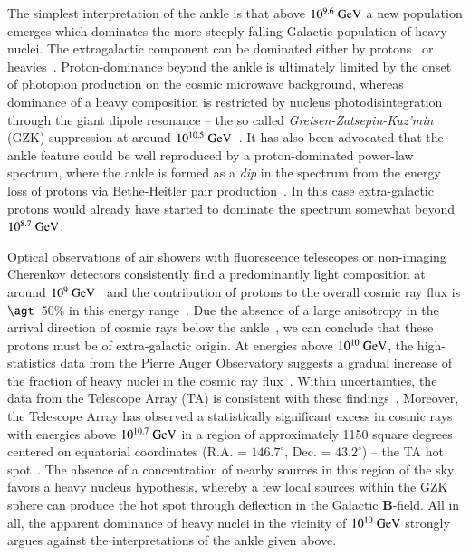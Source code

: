 \documentclass[aps,prd,twocolumn,superscriptaddress,tightenlines,nofootinbib]{revtex4-1}
\begin{document}
The simplest interpretation of the ankle is that above $10^{9.6}~{\rm
  GeV}$ a new population emerges which dominates the more steeply
falling Galactic population of heavy nuclei. The extragalactic
component can be dominated either by protons~\cite{Bird:1993yi} or
heavies~\cite{Allard:2005ha,Allard:2005cx}. Proton-dominance beyond
the ankle is ultimately limited by the onset of photopion production
on the cosmic microwave background, whereas dominance of a heavy
composition is restricted by nucleus photodisintegration through the
giant dipole resonance  --
the so called {\it Greisen-Zatsepin-Kuz'min} (GZK) suppression at
around $10^{10.5}~{\rm GeV}$~\cite{Greisen:1966jv,Zatsepin:1966jv}.  It has also been advocated that
the ankle feature could be well reproduced by a proton-dominated power-law
spectrum, where the ankle is formed as a {\it dip} in the spectrum
from the energy loss of protons via Bethe-Heitler pair
production~\cite{Hillas:1967,Berezinsky:2002nc}. In this case
extra-galactic protons would already have started to dominate the
spectrum somewhat beyond $10^{8.7}~{\rm GeV}$.

Optical observations of air showers with fluorescence telescopes or
non-imaging Cherenkov detectors consistently find a predominantly
light composition at around $10^9~{\rm GeV}$~\cite{Kampert:2012mx} and
the contribution of protons to the overall cosmic ray flux is
$\agt$~50\% in this energy range~\cite{Aab:2014kda,Aab:2014aea,Aab:2016htd,Aab:2016zth}.  Due
the absence of a large anisotropy in the arrival direction of cosmic
rays below the ankle~\cite{Auger:2012an,ThePierreAuger:2014nja}, we
can conclude that these protons must be of extra-galactic origin.  At
energies above $10^{10}~{\rm GeV}$, the high-statistics data from the
Pierre Auger Observatory suggests a gradual increase of the fraction
of heavy nuclei in the cosmic ray flux~\cite{Aab:2014aea,
  Aab:2014kda,Aab:2016htd,Aab:2016zth}. Within uncertainties, the data
from the Telescope Array (TA) is consistent with these
findings~\cite{Abbasi:2014sfa, Abbasi:2015xga}. Moreover, the
Telescope Array has observed a statistically significant excess in
cosmic rays with energies above $10^{10.7}~{\rm GeV}$ in a region of
approximately 1150 square degrees centered on equatorial coordinates
(R.A. = $146.7^\circ$, Dec. = $43.2^\circ$) -- the TA hot spot~\cite{Abbasi:2014lda}. The
absence of a concentration of nearby sources in this region of the sky
favors a heavy nucleus hypothesis, whereby a few local sources within
the GZK sphere can
produce the hot spot through deflection in the Galactic ${\bm
  B}$-field. All in all, the apparent dominance of heavy nuclei in the
vicinity of $10^{10}~{\rm GeV}$ strongly argues against the
interpretations of the ankle given above.
\end{document}
